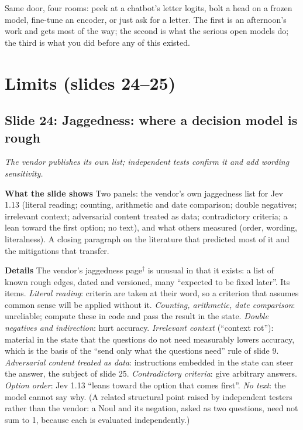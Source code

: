 \documentclass[11pt,letterpaper]{article}
\newcommand{\setstage}[1]{\colorlet{stagec}{#1}}
\newcommand{\slide}[3]{%
  \subsection[Slide #1: #2]{Slide #1: #2}%
  {\color{muted}\itshape #3\par}\medskip}
\newcommand{\para}[1]{\medskip\noindent\textbf{#1}\quad}
\newenvironment{intuition}{\begin{tcolorbox}[intuitionbox]}{\end{tcolorbox}}
\begin{document}
\begin{intuition}
Same door, four rooms: peek at a chatbot's letter logits, bolt a head on a frozen model, fine-tune an encoder, or just ask for a letter. The first is an afternoon's work and gets most of the way; the second is what the serious open models do; the third is what you did before any of this existed.
\end{intuition}
\setstage{trn}
\section{Limits (slides 24--25)}

\slide{24}{Jaggedness: where a decision model is rough}{The vendor publishes its own list; independent tests confirm it and add wording sensitivity.}

\para{What the slide shows} Two panels: the vendor's own jaggedness list for Jev 1.13 (literal reading; counting, arithmetic and date comparison; double negatives; irrelevant context; adversarial content treated as data; contradictory criteria; a lean toward the first option; no text), and what others measured (order, wording, literalness). A closing paragraph on the literature that predicted most of it and the mitigations that transfer.

\para{Details} The vendor's jaggedness page$^\dagger$ is unusual in that it exists: a list of known rough edges, dated and versioned, many ``expected to be fixed later''. Its items. \emph{Literal reading}: criteria are taken at their word, so a criterion that assumes common sense will be applied without it. \emph{Counting, arithmetic, date comparison}: unreliable; compute these in code and pass the result in the state. \emph{Double negatives and indirection}: hurt accuracy. \emph{Irrelevant context} (``context rot''): material in the state that the questions do not need measurably lowers accuracy, which is the basis of the ``send only what the questions need'' rule of slide 9. \emph{Adversarial content treated as data}: instructions embedded in the state can steer the answer, the subject of slide 25. \emph{Contradictory criteria}: give arbitrary answers. \emph{Option order}: Jev 1.13 ``leans toward the option that comes first''. \emph{No text}: the model cannot say why. (A related structural point raised by independent testers rather than the vendor: a Noul and its negation, asked as two questions, need not sum to 1, because each is evaluated independently.)
\end{document}
